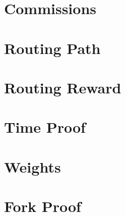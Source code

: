 \documentclass[a4paper,10pt]{article}
\begin{document}
\section{Commissions}
\section{Routing Path}
\section{Routing Reward}
\section{Time Proof}
\section{Weights}
\section{Fork Proof}
\end{document}
